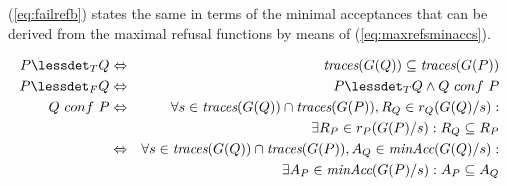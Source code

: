 (\ref{eq:failrefb}) states the same in terms of the minimal acceptances that
can be derived from the maximal refusal functions by means of
(\ref{eq:maxrefsminaccs}). 
%
\begin{lemma}
  \label{lemma:tgtrcref}
  \begin{eqnarray}
  P \lessdet_T Q & \Leftrightarrow & \trc(G(Q)) \subseteq\trc(G(P))
  \label{eq:trcrefa}
  \\
  \label{eq:failconf}
  P \lessdet_F Q & \Leftrightarrow & P \lessdet_T Q \wedge Q\ conf\ P
  \\
  \label{eq:failrefa}
  Q\ conf\ P & \Leftrightarrow & \nonumber
  \forall s\in\trc(G(Q))\cap \trc(G(P)), R_Q\in r_Q(G(Q)/s):  \nonumber
  \\ & & \tabd
  \exists R_P\in r_P(G(P)/s): R_Q\subseteq R_P
  \\
  \label{eq:failrefb}
   & \Leftrightarrow &
    \forall s\in\trc(G(Q))\cap \trc(G(P)), A_Q\in\minaccs(G(Q)/s):  \nonumber
   \\ & & \tabd
  \exists A_P\in\minaccs(G(P)/s): A_P\subseteq A_Q
 \end{eqnarray}
  \xbox
\end{lemma}
%
